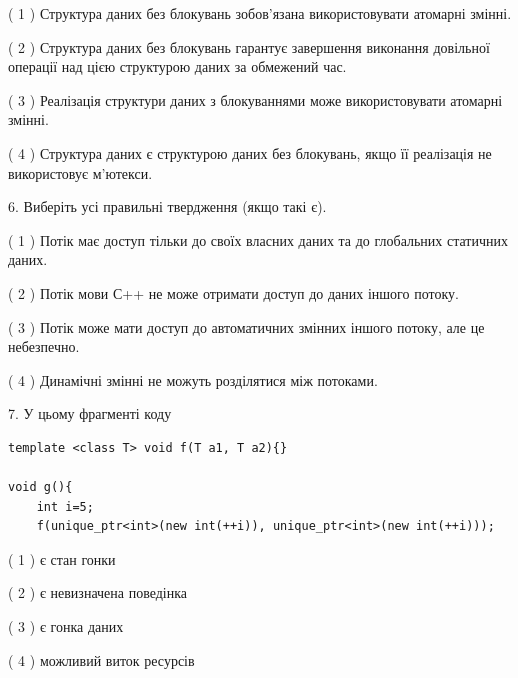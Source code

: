 \documentclass[12pt, ukrainian]{article}
\begin{document}
\begin {large}
{( 1 ) Структура даних без блокувань зобов’язана використовувати атомарні змінні.%

( 2 ) Структура даних без блокувань гарантує завершення виконання довільної операції над цією структурою даних за обмежений час.%

( 3 ) Реалізація структури даних з блокуваннями може використовувати атомарні змінні.%

( 4 ) Структура даних є структурою даних без блокувань, якщо її реалізація не використовує м’ютекси.%
\newpage



\vspace{5mm}
6. Виберіть усі правильні твердження (якщо такі є).\par
\vspace{2mm}

( 1 ) Потік має доступ тільки до своїх власних даних та до глобальних статичних даних.%

( 2 ) Потік мови С++ не може отримати доступ до даних іншого потоку.%

( 3 ) Потік може мати доступ до автоматичних змінних іншого потоку, але це небезпечно.%

( 4 ) Динамічні змінні не можуть розділятися між потоками.%


\vspace{5mm}
7. У цьому фрагменті коду
\begin{verbatim}
template <class T> void f(T a1, T a2){}

void g(){
    int i=5;
    f(unique_ptr<int>(new int(++i)), unique_ptr<int>(new int(++i)));
\end{verbatim}

( 1 ) є стан гонки%

( 2 ) є невизначена поведінка%

( 3 ) є гонка даних%

( 4 ) можливий виток ресурсів%
}
\end {large}
\end{document}
